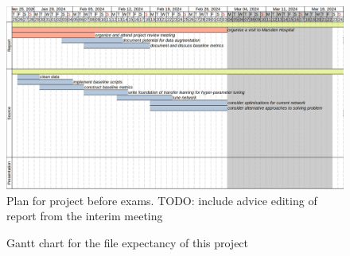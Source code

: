 \documentclass[11pt,twoside]{report}
\begin{document}
\begin{figure}[H]
  \centering
  \includegraphics[width=\linewidth, trim={0 7.25cm 0.1cm 0}, clip]{gantt/plan-pre-exam.png}
  \caption{Plan for project before exams. TODO: include advice editing of report from the interim meeting}
  \label{fig:plan-pre-exam}
\end{figure}

\begin{figure}[H]\ContinuedFloat
  \centering


  \caption{Gantt chart for the file expectancy of this project}
  \label{fig:gantt}
\end{figure}
\end{document}
